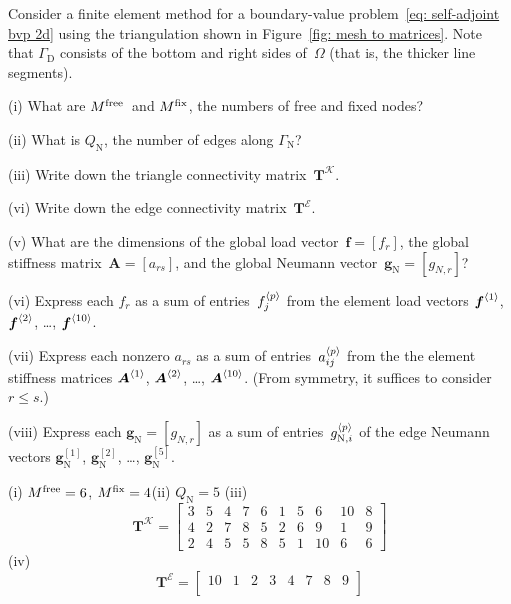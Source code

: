 \begin{Exercises}
\exercise\label{ex: mesh to matrices}
Consider a finite element method for a boundary-value 
problem~\eqref{eq: self-adjoint bvp 2d} using the triangulation shown in 
Figure~\ref{fig: mesh to matrices}.  Note that $\Gamma_{\mathrm{D}}$ consists 
of the bottom and right sides of~$\Omega$ (that is, the thicker line segments).
\begin{description}
\item{(i)} What are $M^{\mathrm{free}}$~and $M^{\mathrm{fix}}$, the numbers of free and fixed nodes?
\item{(ii)} What is $Q_{\mathrm{N}}$, the number of edges along 
$\Gamma_{\mathrm{N}}$?
\item{(iii)} Write down the triangle connectivity 
matrix~$\boldsymbol{T}^{\mathcal{K}}$.
\item{(vi)} Write down the edge connectivity 
matrix~$\boldsymbol{T}^{\mathcal{E}}$.
\item{(v)} 
What are the dimensions of the global load vector~$\boldsymbol{f}=[f_r]$,
the global stiffness matrix~$\boldsymbol{A}=[a_{rs}]$, and the
global Neumann vector~$\boldsymbol{g}_{\mathrm{N}}=[g_{N,r}]$?
\item{(vi)}
Express each $f_r$ as a sum of entries~$f^{\langle p\rangle}_j$ from the element load 
vectors $\boldsymbol{f}^{\langle1\rangle}$, $\boldsymbol{f}^{\langle2\rangle}$, \dots,
$\boldsymbol{f}^{\langle10\rangle}$.
\item{(vii)}
Express each nonzero $a_{rs}$ as a sum of entries~$a^{\langle p\rangle}_{ij}$ from the the 
element stiffness matrices $\boldsymbol{A}^{\langle1\rangle}$, $\boldsymbol{A}^{\langle2\rangle}$, 
\dots, $\boldsymbol{A}^{\langle10\rangle}$.  (From symmetry, it suffices to consider
$r\le s$.)
\item{(viii)}
Express each $\boldsymbol{g}_{\mathrm{N}}=[g_{N,r}]$ as a sum of 
entries~$g^{\langle p\rangle}_{\mathrm{N},i}$ of the edge Neumann vectors 
$\boldsymbol{g}^{[1]}_{\mathrm{N}}$, $\boldsymbol{g}^{[2]}_{\mathrm{N}}$, 
\dots, $\boldsymbol{g}^{[5]}_{\mathrm{N}}$.
\end{description}
\begin{ans}
(i) $M^{\mathrm{free}}=6$, $M^{\mathrm{fix}}=4$\quad (ii) $Q_{\mathrm{N}}=5$
(iii) 
\[
\boldsymbol{T}^{\mathcal{K}}=\begin{bmatrix}
 3& 5& 4& 7& 6& 1& 5&  6& 10& 8\\
 4& 2& 7& 8& 5& 2& 6&  9&  1& 9\\
 2& 4& 5& 5& 8& 5& 1& 10&  6& 6\end{bmatrix}
\]
(iv)
\[
\boldsymbol{T}^{\mathcal{E}}=\begin{bmatrix}
10& 1& 2& 3& 4& 7& 8&  9\\

\end{bmatrix}\]
\end{ans}
\end{Exercises}
